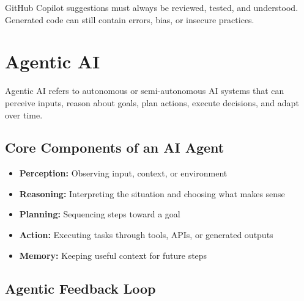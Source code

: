 \documentclass[11pt,a4paper]{article}
\begin{document}
\begin{alertbox}
GitHub Copilot suggestions must always be reviewed, tested, and understood. Generated code can still contain errors, bias, or insecure practices.
\end{alertbox}

\section{Agentic AI}

\begin{definitionbox}[Agentic AI]
Agentic AI refers to autonomous or semi-autonomous AI systems that can perceive inputs, reason about goals, plan actions, execute decisions, and adapt over time.
\end{definitionbox}

\subsection{Core Components of an AI Agent}

\begin{itemize}[leftmargin=*]
  \item \textbf{Perception:} Observing input, context, or environment
  \item \textbf{Reasoning:} Interpreting the situation and choosing what makes sense
  \item \textbf{Planning:} Sequencing steps toward a goal
  \item \textbf{Action:} Executing tasks through tools, APIs, or generated outputs
  \item \textbf{Memory:} Keeping useful context for future steps
\end{itemize}

\subsection{Agentic Feedback Loop}
\end{document}
